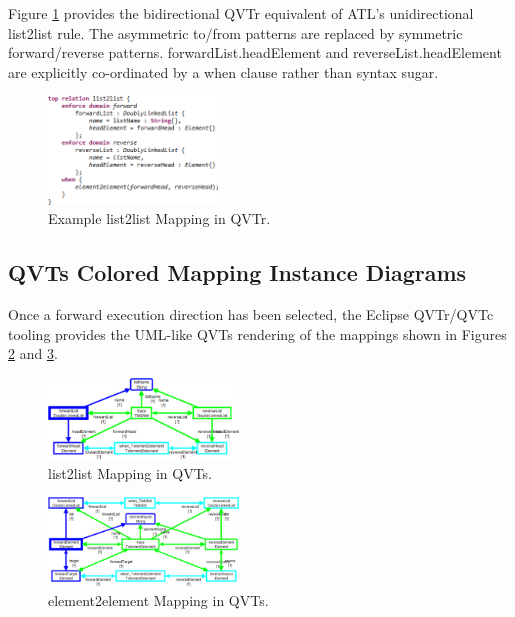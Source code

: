 \documentclass[conference]{IEEEtran}
\begin{document}
Figure \ref{fig:List2List-QVTr} provides the bidirectional QVTr equivalent of ATL's unidirectional list2list rule. The asymmetric to/from patterns are replaced by symmetric forward/reverse patterns. forwardList.headElement and reverseList.headElement are explicitly co-ordinated by a when clause rather than syntax sugar.

\begin{figure}[h]
	\centering
	\includegraphics[width=0.4\textwidth]{List2List-QVTr.png}
	\caption{Example list2list Mapping in QVTr.}
	\label{fig:List2List-QVTr}
\end{figure}


\subsection{QVTs Colored Mapping Instance Diagrams}

Once a forward execution direction has been selected, the Eclipse QVTr/QVTc tooling provides the UML-like QVTs rendering of the mappings shown in Figures \ref{fig:List2List-QVTs} and \ref{fig:Element2Element-QVTs}.

\begin{figure}[h]
	\centering
	\includegraphics[width=0.45\textwidth]{List2List-QVTs.png}
	\caption{list2list Mapping in QVTs.}
	\label{fig:List2List-QVTs}
\end{figure}

\begin{figure}[h]
	\centering
	\includegraphics[width=0.45\textwidth]{Element2Element-QVTs.png}
	\caption{element2element Mapping in QVTs.}
	\label{fig:Element2Element-QVTs}
\end{figure}
\end{document}
